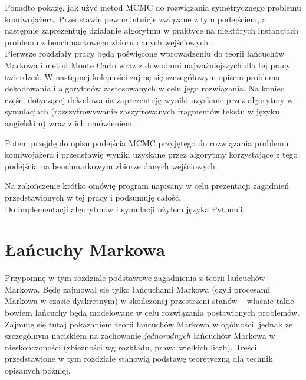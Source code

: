 \documentclass[a4paper]{article}
\theoremstyle{defn}
\theoremstyle{theorem}
\theoremstyle{lemma}
\theoremstyle{cor}
\theoremstyle{fact}
\begin{document}
Ponadto pokażę, jak użyć metod MCMC do rozwiązania symetrycznego problemu komiwojażera. Przedstawię pewne intuicje związane z tym podejściem, a następnie zaprezentuję działanie algorytmu w praktyce na niektórych instancjach problemu z benchmarkowego zbioru danych wejściowych \cite{benchmark}.
\\

Pierwsze rozdziały pracy będą poświęcone wprowadzeniu do teorii łańcuchów Markowa i metod Monte Carlo wraz z dowodami najważniejszych dla tej pracy twierdzeń. W następnej kolejności zajmę się szczegółowym opisem problemu dekodowania i algorytmów zastosowanych w celu jego rozwiązania. Na koniec części dotyczącej dekodowania zaprezentuję wyniki uzyskane przez algorytmy w symulacjach (rozszyfrowywanie zaszyfrowanych fragmentów tekstu w języku angielskim) wraz z ich omówieniem.

Potem przejdę do opisu podejścia MCMC przyjętego do rozwiązania problemu komiwojażera i przedstawię wyniki uzyskane przez algorytmy korzystające z tego podejścia na benchmarkowym zbiorze danych wejściowych.

Na zakończenie krótko omówię program napisany w celu prezentacji zagadnień przedstawionych w tej pracy i podsumuję całość.
\\

Do implementacji algorytmów i symulacji użyłem języka Python3.

\newpage

\section{Łańcuchy Markowa}
\label{sect2}
Przypomnę w tym rozdziale podstawowe zagadnienia z teorii łańcuchów Markowa. Będę zajmował się tylko łańcuchami Markowa (czyli procesami Markowa w czasie dyskretnym) w skończonej przestrzeni stanów – właśnie takie bowiem łańcuchy będą modelowane w celu rozwiązania postawionych problemów. Zajmuję się tutaj pokazaniem teorii łańcuchów Markowa w ogólności, jednak ze szczególnym naciskiem na zachowanie \textit{jednorodnych} łańcuchów Markowa w nieskończoności (zbieżności wg rozkładu, prawa wielkich liczb). Treści przedstawione w tym rozdziale stanowią podstawę teoretyczną dla technik opisanych później.
\end{document}
